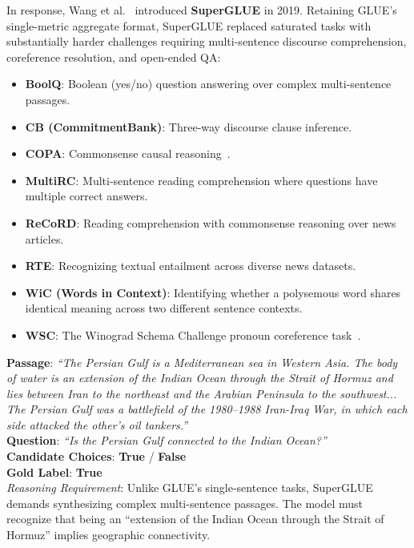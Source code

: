 \documentclass[../../../main.tex]{subfiles}
\begin{document}
In response, Wang et al.~\cite{wang2019superglue} introduced \textbf{SuperGLUE} in 2019. Retaining GLUE's single-metric aggregate format, SuperGLUE replaced saturated tasks with substantially harder challenges requiring multi-sentence discourse comprehension, coreference resolution, and open-ended QA:
\begin{itemize}
    \item \textbf{BoolQ}: Boolean (yes/no) question answering over complex multi-sentence passages.
    \item \textbf{CB (CommitmentBank)}: Three-way discourse clause inference.
    \item \textbf{COPA}: Commonsense causal reasoning~\cite{roemmele2011copa}.
    \item \textbf{MultiRC}: Multi-sentence reading comprehension where questions have multiple correct answers.
    \item \textbf{ReCoRD}: Reading comprehension with commonsense reasoning over news articles.
    \item \textbf{RTE}: Recognizing textual entailment across diverse news datasets.
    \item \textbf{WiC (Words in Context)}: Identifying whether a polysemous word shares identical meaning across two different sentence contexts.
    \item \textbf{WSC}: The Winograd Schema Challenge pronoun coreference task~\cite{levesque2012winograd}.
\end{itemize}

\begin{center}
\begin{minipage}{0.95\textwidth}
\begin{tcolorbox}[colback=cardBg,colframe=cardLine,arc=2pt,boxrule=0.5pt,title=\textbf{SuperGLUE Benchmark Example: Boolean Question Answering (BoolQ)}]
\small\sffamily
\textbf{Passage}: \textit{``The Persian Gulf is a Mediterranean sea in Western Asia. The body of water is an extension of the Indian Ocean through the Strait of Hormuz and lies between Iran to the northeast and the Arabian Peninsula to the southwest... The Persian Gulf was a battlefield of the 1980--1988 Iran-Iraq War, in which each side attacked the other's oil tankers.''} \\
\textbf{Question}: \textit{``Is the Persian Gulf connected to the Indian Ocean?''} \\
\textbf{Candidate Choices}: \textbf{True} / \textbf{False} \\
\textbf{Gold Label}: \textbf{True} \\
\textit{Reasoning Requirement}: Unlike GLUE's single-sentence tasks, SuperGLUE demands synthesizing complex multi-sentence passages. The model must recognize that being an ``extension of the Indian Ocean through the Strait of Hormuz'' implies geographic connectivity.
\end{tcolorbox}
\end{minipage}
\end{center}
\end{document}
